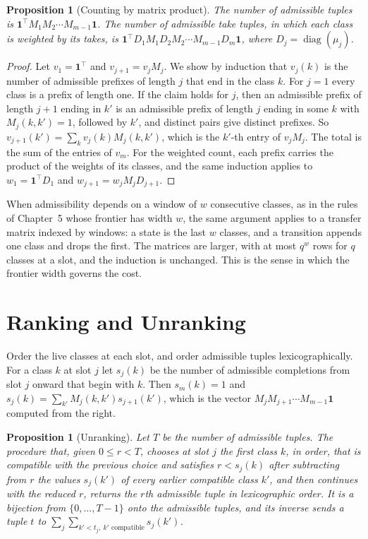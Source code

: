 \documentclass[11pt,twoside,openright]{book}
\theoremstyle{plain}
\newtheorem{proposition}[theorem]{Proposition}
\theoremstyle{definition}
\theoremstyle{remark}
\begin{document}
\begin{proposition}[Counting by matrix product]\label{prop:transfer}
The number of admissible tuples is $\mathbf 1^{\top}M_1M_2\cdots M_{m-1}\mathbf 1$. The number of admissible take tuples, in which each class is weighted by its takes, is $\mathbf 1^{\top}D_1M_1D_2M_2\cdots M_{m-1}D_m\mathbf 1$, where $D_j=\operatorname{diag}(\mu_j)$.
\end{proposition}

\begin{proof}
Let $v_1=\mathbf 1^{\top}$ and $v_{j+1}=v_jM_j$. We show by induction that $v_j(k)$ is the number of admissible prefixes of length $j$ that end in the class $k$. For $j=1$ every class is a prefix of length one. If the claim holds for $j$, then an admissible prefix of length $j+1$ ending in $k'$ is an admissible prefix of length $j$ ending in some $k$ with $M_j(k,k')=1$, followed by $k'$, and distinct pairs give distinct prefixes. So $v_{j+1}(k')=\sum_kv_j(k)M_j(k,k')$, which is the $k'$-th entry of $v_jM_j$. The total is the sum of the entries of $v_m$. For the weighted count, each prefix carries the product of the weights of its classes, and the same induction applies to $w_1=\mathbf 1^{\top}D_1$ and $w_{j+1}=w_jM_jD_{j+1}$.
\end{proof}

When admissibility depends on a window of $w$ consecutive classes, as in the rules of Chapter~5 whose frontier has width $w$, the same argument applies to a transfer matrix indexed by windows: a state is the last $w$ classes, and a transition appends one class and drops the first. The matrices are larger, with at most $q^w$ rows for $q$ classes at a slot, and the induction is unchanged. This is the sense in which the frontier width governs the cost.

\section{Ranking and Unranking}\label{sec:rank}

Order the live classes at each slot, and order admissible tuples lexicographically. For a class $k$ at slot $j$ let $s_j(k)$ be the number of admissible completions from slot $j$ onward that begin with $k$. Then $s_m(k)=1$ and $s_j(k)=\sum_{k'}M_j(k,k')s_{j+1}(k')$, which is the vector $M_jM_{j+1}\cdots M_{m-1}\mathbf 1$ computed from the right.

\begin{proposition}[Unranking]\label{prop:unrankapp}
Let $T$ be the number of admissible tuples. The procedure that, given $0\le r<T$, chooses at slot $j$ the first class $k$, in order, that is compatible with the previous choice and satisfies $r<s_j(k)$ after subtracting from $r$ the values $s_j(k')$ of every earlier compatible class $k'$, and then continues with the reduced $r$, returns the $r$th admissible tuple in lexicographic order. It is a bijection from $\{0,\dots,T-1\}$ onto the admissible tuples, and its inverse sends a tuple $t$ to $\sum_j\sum_{k'<t_j,\ k'\text{ compatible}}s_j(k')$.
\end{proposition}
\end{document}

